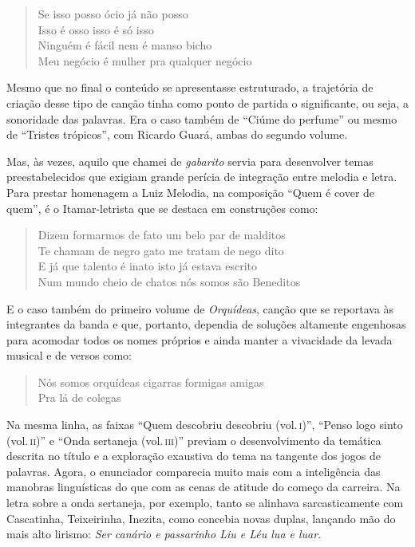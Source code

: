 \begin{verse}
Se isso posso ócio já não posso\\
Isso é osso isso é só isso\\
Ninguém é fácil nem é manso bicho\\
Meu negócio é mulher pra qualquer negócio
\end{verse}

Mesmo que no final o conteúdo se apresentasse estruturado, a trajetória
de criação desse tipo de canção tinha como ponto de partida o
significante, ou seja, a sonoridade das palavras. Era o caso também de
``Ciúme do perfume'' ou mesmo de ``Tristes trópicos'', com Ricardo Guará, ambas
do segundo volume.

Mas, às vezes, aquilo que chamei de \textit{gabarito} servia para desenvolver
temas preestabelecidos que exigiam grande perícia de integração entre
melodia e letra. Para prestar homenagem a Luiz Melodia, na composição
``Quem é cover de quem'', é o Itamar-letrista que se destaca em construções
como:

\begin{verse}
Dizem formarmos de fato um belo par de malditos\\
Te chamam de negro gato me tratam de nego dito\\
E já que talento é inato isto já estava escrito\\
Num mundo cheio de chatos nós somos são Beneditos
\end{verse}

E o caso também do primeiro volume de \textit{Orquídeas}, canção que se reportava às
integrantes da banda e que, portanto, dependia de soluções altamente
engenhosas para acomodar todos os nomes próprios e ainda manter a
vivacidade da levada musical e de versos como:

\begin{verse}
Nós somos orquídeas cigarras formigas amigas\\
Pra lá de colegas
\end{verse}

Na mesma linha, as faixas ``Quem descobriu descobriu (vol.\,\textsc{i})'', ``Penso logo
sinto (vol.\,\textsc{ii})'' e ``Onda sertaneja (vol.\,\textsc{iii})'' previam o desenvolvimento da
temática descrita no título e a exploração exaustiva do tema na tangente
dos jogos de palavras. Agora, o enunciador comparecia muito mais com a
inteligência das manobras linguísticas do que com as cenas de atitude do
começo da carreira. Na letra sobre a onda sertaneja, por exemplo, tanto
se alinhava sarcasticamente com Cascatinha, Teixeirinha, Inezita, como
concebia novas duplas, lançando mão do mais alto lirismo: \textit{Ser canário
e passarinho Liu e Léu lua e luar}.

